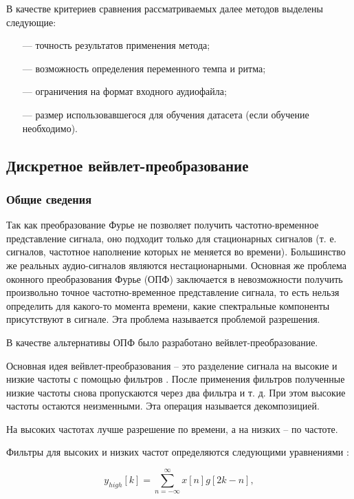 В качестве критериев сравнения рассматриваемых далее методов выделены следующие:

\begin{itemize}
	\item[---] точность результатов применения метода;
	\item[---] возможность определения переменного темпа и ритма;
	\item[---] ограничения на формат входного аудиофайла;
	\item[---] размер использовавшегося для обучения датасета (если обучение необходимо).
\end{itemize}

\subsection{Дискретное вейвлет-преобразование}

\subsubsection{Общие сведения}

Так как преобразование Фурье не позволяет получить частотно-временное представление сигнала, оно подходит только для стационарных сигналов (т. е. сигналов, частотное наполнение которых не меняется во времени). Большинство же реальных аудио-сигналов являются нестационарными. Основная же проблема оконного преобразования Фурье (ОПФ) заключается в невозможности получить произвольно точное частотно-временное представление сигнала, то есть нельзя определить для какого-то момента времени, какие спектральные компоненты присутствуют в сигнале. Эта проблема называется проблемой разрешения.

В качестве альтернативы ОПФ было разработано вейвлет-преобразование.

Основная идея вейвлет-преобразования -- это разделение сигнала на высокие и низкие частоты с помощью фильтров \cite{polikar}. После применения фильтров полученные низкие частоты снова пропускаются через два фильтра и т. д. При этом высокие частоты остаются неизменными. Эта операция называется декомпозицией.

На высоких частотах лучше разрешение по времени, а на низких -- по частоте.

Фильтры для высоких и низких частот определяются следующими уравнениями \cite{dwt}:

\begin{equation}\label{eq:highpass}
	y_{high}[k] = \sum_{n=-\infty}^{\infty} x[n] g[2k-n],
\end{equation}

